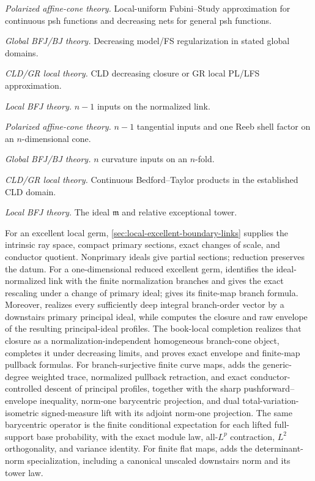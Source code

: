 \begin{description}[style=nextline,leftmargin=1.5em,labelindent=0pt,
                    itemsep=.75\baselineskip]
\emph{Polarized affine-cone theory.} Local-uniform Fubini--Study
approximation for continuous psh functions and decreasing nets for general
psh functions.

\emph{Global BFJ/BJ theory.} Decreasing model/FS regularization in stated
global domains.

\emph{CLD/GR local theory.} CLD decreasing closure or GR local PL/LFS
approximation.

\item[Measure]
\emph{Local BFJ theory.} $n-1$ inputs on the normalized link.

\emph{Polarized affine-cone theory.} $n-1$ tangential inputs and one Reeb
shell factor on an $n$-dimensional cone.

\emph{Global BFJ/BJ theory.} $n$ curvature inputs on an $n$-fold.

\emph{CLD/GR local theory.} Continuous Bedford--Taylor products in the
established CLD domain.

\item[Boundary data]
\emph{Local BFJ theory.} The ideal $\mathfrak m$ and relative exceptional
tower.

For an excellent local germ,
\cref{sec:local-excellent-boundary-links} supplies the intrinsic ray space,
compact primary sections, exact changes of scale, and conductor quotient.
Nonprimary ideals give partial sections; reduction preserves the datum.
For a one-dimensional reduced excellent germ,
 identifies the ideal-normalized
link with the finite normalization branches and gives the exact rescaling
under a change of primary ideal; 
gives its finite-map branch formula.  Moreover,
 realizes every
sufficiently deep integral branch-order vector by a downstairs primary
principal ideal, while 
computes the closure and raw envelope of the resulting principal-ideal
profiles.  The book-local completion
 realizes that closure as a
normalization-independent homogeneous branch-cone object, completes it under
decreasing limits, and proves exact envelope and finite-map pullback formulas.
For branch-surjective finite curve maps,
 adds the generic-degree
weighted trace, normalized pullback retraction, and exact
conductor-controlled descent of principal profiles, together with the sharp
pushforward--envelope inequality, norm-one barycentric projection, and dual
total-variation-isometric signed-measure lift with its adjoint norm-one
projection.  The same barycentric operator is the finite conditional
expectation for each lifted full-support base probability, with the exact
module law, all-$L^p$ contraction, $L^2$ orthogonality, and variance
identity.  For finite flat maps,
 adds the determinant-norm
specialization, including a canonical unscaled downstairs norm and its
tower law.


\end{description}
